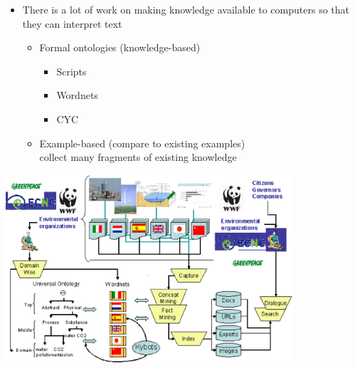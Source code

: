 \documentclass[headrule,footrule]{foils}
\begin{document}


\begin{itemize}
\item There is a lot of work on making knowledge available to
  computers so that they can interpret text
  \begin{itemize}
  \item Formal ontologies (knowledge-based)
    \begin{itemize}
    \item Scripts
    \item Wordnets
    \item CYC
    \end{itemize}
  \item Example-based (compare to existing examples)
    \\ collect many fragments of existing knowledge
  \end{itemize}
\end{itemize}


\begin{center}
  \includegraphics[width=0.8\textwidth]{pics/kyoto-project.eps}
\end{center}
\end{document}
